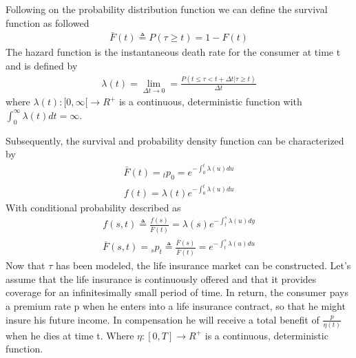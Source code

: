 \documentclass[letterpaper,10pt,english]{jupyterBook}
\begin{document}
\sphinxAtStartPar
Following on the probability distribution function we can define the survival function as followed
\begin{equation*}
\begin{split} \bar{F}(t)\triangleq P(\tau \ge t) = 1 -F(t) \end{split}
\end{equation*}
\sphinxAtStartPar
The hazard function is the  instantaneous death rate for the consumer at time t and is defined by
\begin{equation*}
\begin{split} \lambda(t) = \lim_{\Delta t\to 0} = \frac{P(t\le\tau < t+\Delta t| \tau \ge t)}{\Delta t} \end{split}
\end{equation*}
\sphinxAtStartPar
where \(\lambda(t): [0,\infty[ \to R^+\) is a continuous, deterministic function with \(\int_0^\infty \lambda(t) dt = \infty\).

\sphinxAtStartPar
Subsequently, the survival and probability density function can be characterized by
\begin{equation*}
\begin{split} \bar{F}(t)= {}_tp_0= e^{-\int_0^t \lambda(u)du} \end{split}
\end{equation*}\begin{equation*}
\begin{split} f(t)=\lambda(t) e^{-\int_0^t\lambda(u)du} \end{split}
\end{equation*}
\sphinxAtStartPar
With conditional probability described as
\begin{equation*}
\begin{split} f(s,t) \triangleq \frac{f(s)}{\bar{F}(t)}=\lambda(s) e^{-\int_t^s\lambda(u)dy} \end{split}
\end{equation*}\begin{equation*}
\begin{split} \bar{F}(s,t) = {}_sp_t \triangleq \frac{\bar{F}(s)}{\bar{F}(t)} = e^{-\int_t^s \lambda(u)du} \end{split}
\end{equation*}
\sphinxAtStartPar
Now that \(\tau\) has been modeled, the life insurance market can be constructed. Let’s assume that the life insurance is continuously offered and that it provides coverage for an infinitesimally small period of time. In return, the consumer pays a premium rate p when he enters into a life insurance contract, so that he might insure his future income. In compensation he will receive  a total benefit of \(\frac{p}{\eta(t)}\) when he dies at time t. Where \(\eta : [0,T] \to R^+ \) is a continuous, deterministic function.
\end{document}
